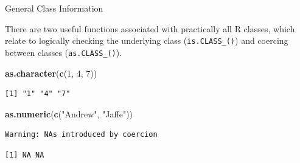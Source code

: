 \documentclass[
  ignorenonframetext,
]{beamer}
\newenvironment{Shaded}{\begin{snugshade}}{\end{snugshade}}
\newcommand{\DecValTok}[1]{\textcolor[rgb]{0.00,0.00,0.81}{#1}}
\newcommand{\KeywordTok}[1]{\textcolor[rgb]{0.13,0.29,0.53}{\textbf{#1}}}
\newcommand{\NormalTok}[1]{#1}
\newcommand{\StringTok}[1]{\textcolor[rgb]{0.31,0.60,0.02}{#1}}
\begin{document}
\begin{frame}[fragile]{General Class Information}
\protect\hypertarget{general-class-information-1}{}

There are two useful functions associated with practically all R
classes, which relate to logically checking the underlying class
(\texttt{is.CLASS\_()}) and coercing between classes
(\texttt{as.CLASS\_()}).

\begin{Shaded}
\begin{Highlighting}[]
\KeywordTok{as.character}\NormalTok{(}\KeywordTok{c}\NormalTok{(}\DecValTok{1}\NormalTok{, }\DecValTok{4}\NormalTok{, }\DecValTok{7}\NormalTok{))}
\end{Highlighting}
\end{Shaded}

\begin{verbatim}
[1] "1" "4" "7"
\end{verbatim}

\begin{Shaded}
\begin{Highlighting}[]
\KeywordTok{as.numeric}\NormalTok{(}\KeywordTok{c}\NormalTok{(}\StringTok{"Andrew"}\NormalTok{, }\StringTok{"Jaffe"}\NormalTok{))}
\end{Highlighting}
\end{Shaded}

\begin{verbatim}
Warning: NAs introduced by coercion
\end{verbatim}

\begin{verbatim}
[1] NA NA
\end{verbatim}

\end{frame}
\end{document}
